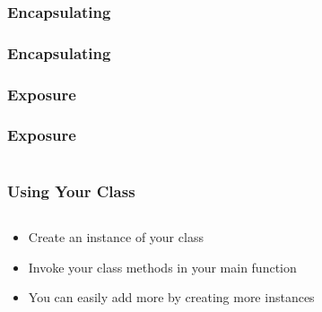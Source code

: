 \begin{frame}[fragile]
	\frametitle{Encapsulating}
\end{frame}

\begin{frame}[fragile]
	\frametitle{Encapsulating}
	
\end{frame}

\begin{frame}
	\frametitle{Exposure}
\end{frame}

\begin{frame}[fragile]
	\frametitle{Exposure}
	\begin{columns}[T]
		\begin{column}{0.5\textwidth}
			
		\end{column}
		\begin{column}{0.5\textwidth}
			
		\end{column}
	\end{columns}
\end{frame}

\begin{frame}
	\frametitle{Using Your Class}
	\begin{columns}[T]
		\begin{column}{0.5\textwidth}
			\begin{itemize}
				\item Create an instance of your class
				\item Invoke your class methods in your main function
				\item You can easily add more by creating more instances
			\end{itemize}
		\end{column}
		\begin{column}{0.5\textwidth}
					
		\end{column}
	\end{columns}
\end{frame}